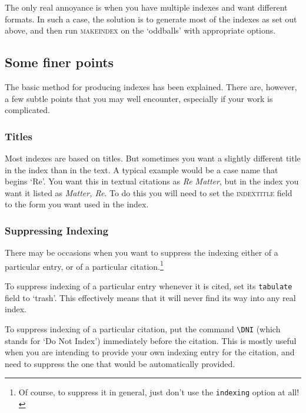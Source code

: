 \documentclass[a4paper,
               11pt,
	       DIV=1,			   
	       footinclude=false]
	      {scrartcl}
\begin{document}
The only real annoyance is when you have multiple indexes and want
different formats. In such a case, the solution is to generate most of
the indexes as set out above, and then run \textsc{makeindex} on the
`oddballs' with appropriate options.

\subsection{Some finer points}

The basic method for producing indexes has been explained. There are,
however, a few subtle points that you may well encounter, especially
if your work is complicated.

\subsubsection{Titles}

Most indexes are based on titles. But sometimes you want a slightly
different title in the index than in the text. A typical example would
be a case name that begins `Re'. You want this in textual citations as
\emph{Re Matter}, but in the index you want it listed as \emph{Matter,
  Re}. To do this you will need to set the \textsc{indextitle} field
to the form you want used in the index.

\subsubsection{Suppressing Indexing}

There may be occasions when you want to suppress the indexing either
of a particular entry, or of a particular citation.\footnote{Of course, to suppress it in general, just don't use the \texttt{indexing} option at all!}

To suppress indexing of a particular entry whenever it is cited, set
its \texttt{tabulate} field to `trash'. This effectively means that it
will never find its way into any real index.

To suppress indexing of a particular citation, put the command
\verb|\DNI| (which stands for `Do Not Index') immediately before the
citation. This is mostly useful when you are intending to provide
your own indexing entry for the citation, and need to suppress the one
that would be automatically provided.
\end{document}
